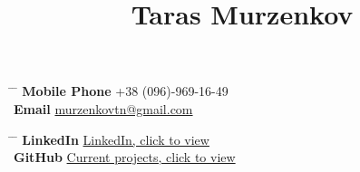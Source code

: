 \documentclass[10pt]{article} %
\begin{document}


\title{Taras Murzenkov } %


\parbox{0.2\textwidth}{ %
\begin{tabbing} %
\hspace{3cm} \= \hspace{4cm} \= \kill %
{\bf Mobile Phone} \>+38 (096)-969-16-49\\ %
{\bf Email} \> \href{mailto:murzenkovtn@gmail.com}{murzenkovtn@gmail.com} \\ %
\end{tabbing}}
\hfill %
\parbox{0.5\textwidth}{ %
\begin{tabbing} %
\hspace{3cm} \= \hspace{4cm} \= \kill %
{\bf LinkedIn} \> \href{https://www.linkedin.com/in/tarasmurzenkov}{LinkedIn, click to view} \\ %
{\bf GitHub} \> \href{https://github.com/tarasmurzenkovv/}{Current projects, click to view}\\ %
\end{tabbing}}

\end{document}
